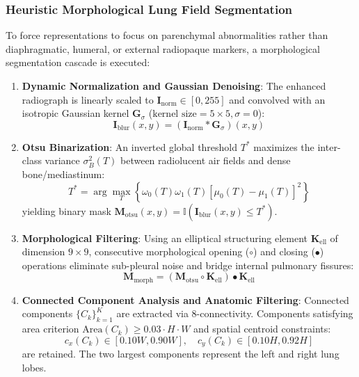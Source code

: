 \documentclass[journal]{IEEEtran}
\begin{document}
\subsubsection{Heuristic Morphological Lung Field Segmentation}
To force representations to focus on parenchymal abnormalities rather than diaphragmatic, humeral, or external radiopaque markers, a morphological segmentation cascade is executed:
\begin{enumerate}
    \item \textbf{Dynamic Normalization and Gaussian Denoising}: The enhanced radiograph is linearly scaled to $\mathbf{I}_{\text{norm}} \in [0, 255]$ and convolved with an isotropic Gaussian kernel $\mathbf{G}_\sigma$ ($\text{kernel size} = 5 \times 5, \sigma = 0$):
    \begin{equation}
    \mathbf{I}_{\text{blur}}(x, y) = (\mathbf{I}_{\text{norm}} * \mathbf{G}_\sigma)(x, y)
    \end{equation}
    \item \textbf{Otsu Binarization}: An inverted global threshold $T^*$ maximizes the inter-class variance $\sigma_B^2(T)$ between radiolucent air fields and dense bone/mediastinum:
    \begin{equation}
    T^* = \arg\max_{T} \left\{ \omega_0(T)\omega_1(T) \left[\mu_0(T) - \mu_1(T)\right]^2 \right\}
    \end{equation}
    yielding binary mask $\mathbf{M}_{\text{otsu}}(x, y) = \mathbb{I}(\mathbf{I}_{\text{blur}}(x, y) \le T^*)$.
    \item \textbf{Morphological Filtering}: Using an elliptical structuring element $\mathbf{K}_{\text{ell}}$ of dimension $9 \times 9$, consecutive morphological opening ($\circ$) and closing ($\bullet$) operations eliminate sub-pleural noise and bridge internal pulmonary fissures:
    \begin{equation}
    \mathbf{M}_{\text{morph}} = (\mathbf{M}_{\text{otsu}} \circ \mathbf{K}_{\text{ell}}) \bullet \mathbf{K}_{\text{ell}}
    \end{equation}
    \item \textbf{Connected Component Analysis and Anatomic Filtering}: Connected components $\{C_k\}_{k=1}^K$ are extracted via 8-connectivity. Components satisfying area criterion $\text{Area}(C_k) \ge 0.03 \cdot H \cdot W$ and spatial centroid constraints:
    \begin{equation}
    c_x(C_k) \in [0.10W, 0.90W], \quad c_y(C_k) \in [0.10H, 0.92H]
    \end{equation}
    are retained. The two largest components represent the left and right lung lobes.

\end{enumerate}
\end{document}
